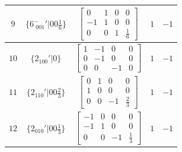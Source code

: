 \documentclass[fleqn,8pt]{jsarticle}
\begin{document}
\begin{longtable}{ccccc}
$ 9 $ & $ \{6^{-}_{\,\,001}{}'|0 0 \frac{1}{6}\} $ & $ \begin{bmatrix} 0 & 1 & 0 & 0 \\ -1 & 1 & 0 & 0 \\ 0 & 0 & 1 & \frac{1}{6} \end{bmatrix} $ & $ 1 $ & $ -1 $ \\ \hline
$ 10 $ & $ \{2{}_{100}{}'|0\} $ & $ \begin{bmatrix} 1 & -1 & 0 & 0 \\ 0 & -1 & 0 & 0 \\ 0 & 0 & -1 & 0 \end{bmatrix} $ & $ 1 $ & $ -1 $ \\ \hline
$ 11 $ & $ \{2{}_{110}{}'|0 0 \frac{2}{3}\} $ & $ \begin{bmatrix} 0 & 1 & 0 & 0 \\ 1 & 0 & 0 & 0 \\ 0 & 0 & -1 & \frac{2}{3} \end{bmatrix} $ & $ 1 $ & $ -1 $ \\ \hline
$ 12 $ & $ \{2{}_{010}{}'|0 0 \frac{1}{3}\} $ & $ \begin{bmatrix} -1 & 0 & 0 & 0 \\ -1 & 1 & 0 & 0 \\ 0 & 0 & -1 & \frac{1}{3} \end{bmatrix} $ & $ 1 $ & $ -1 $ \\
\end{longtable}
\end{document}
